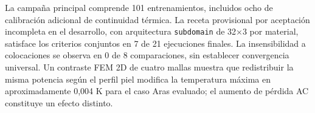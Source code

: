 La campaña principal comprende 101 entrenamientos, incluidos ocho de calibración adicional de continuidad térmica. La receta provisional por aceptación incompleta en el desarrollo, con arquitectura \texttt{subdomain} de 32×3 por material, satisface los criterios conjuntos en 7 de 21 ejecuciones finales. La insensibilidad a colocaciones se observa en 0 de 8 comparaciones, sin establecer convergencia universal. Un contraste FEM 2D de cuatro mallas muestra que redistribuir la misma potencia según el perfil piel modifica la temperatura máxima en aproximadamente 0,004 K para el caso Aras evaluado; el aumento de pérdida AC constituye un efecto distinto.

